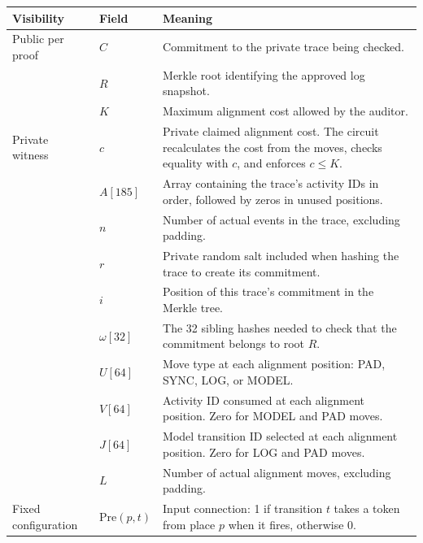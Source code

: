 \documentclass[10pt,a4paper]{article}
\begin{document}
\begin{tabularx}{\textwidth}{
    @{}p{}p{}X@{}
}
\toprule
Visibility & Field & Meaning\\
\midrule

Public per proof
& $C$
& Commitment to the private trace being checked.\\

& $R$
& Merkle root identifying the approved log snapshot.\\

& $K$
& Maximum alignment cost allowed by the auditor.\\

\midrule

Private witness
& $c$
& Private claimed alignment cost. The circuit recalculates
the cost from the moves, checks equality with $c$,
and enforces $c\leq K$.\\

& $A[185]$
& Array containing the trace's activity IDs in order,
followed by zeros in unused positions.\\

& $n$
& Number of actual events in the trace, excluding padding.\\

& $r$
& Private random salt included when hashing the trace
to create its commitment.\\

& $i$
& Position of this trace's commitment in the Merkle tree.\\

& $\omega[32]$
& The 32 sibling hashes needed to check that the
commitment belongs to root $R$.\\

& $U[64]$
& Move type at each alignment position:
PAD, SYNC, LOG, or MODEL.\\

& $V[64]$
& Activity ID consumed at each alignment position.
Zero for MODEL and PAD moves.\\

& $J[64]$
& Model transition ID selected at each alignment position.
Zero for LOG and PAD moves.\\

& $L$
& Number of actual alignment moves, excluding padding.\\

\midrule

Fixed configuration
& $\mathrm{Pre}(p,t)$
& Input connection: 1 if transition $t$ takes a token
from place $p$ when it fires, otherwise 0.\\


\end{tabularx}
\end{document}
